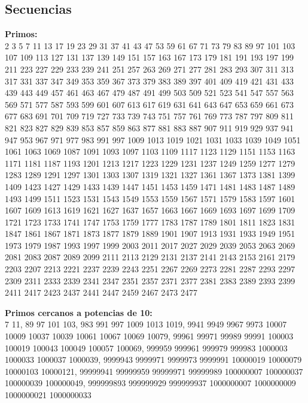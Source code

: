 \documentclass[10pt,landscape,twocolumn,letterpaper,twosided]{article}
\begin{document}
				\subsection{Secuencias}
						
					\textbf{Primos:}\\
					\vspace{3mm}
					2 3 5 7 11 13 17 19 23 29 31 37 41 43 47 53 59 61 67 71 73 79 83 89 97 101 103 107 109 113 127 131 137 139
					149 151 157 163 167 173 179 181 191 193 197 199 211 223 227 229 233 239 241 251 257 263 269 271 277 281 283
					293 307 311 313 317 331 337 347 349 353 359 367 373 379 383 389 397 401 409 419 421 431 433 439 443 449 457
					461 463 467 479 487 491 499 503 509 521 523 541 547 557 563 569 571 577 587 593 599 601 607 613 617 619 631
					641 643 647 653 659 661 673 677 683 691 701 709 719 727 733 739 743 751 757 761 769 773 787 797 809 811 821
					823 827 829 839 853 857 859 863 877 881 883 887 907 911 919 929 937 941 947 953 967 971 977 983 991 997
					1009 1013 1019 1021 1031 1033 1039 1049 1051 1061 1063 1069 1087 1091 1093 1097 1103 1109 1117 1123 1129
					1151 1153 1163 1171 1181 1187 1193 1201 1213 1217 1223 1229 1231 1237 1249 1259 1277 1279 1283 1289 1291
					1297 1301 1303 1307 1319 1321 1327 1361 1367 1373 1381 1399 1409 1423 1427 1429 1433 1439 1447 1451 1453
					1459 1471 1481 1483 1487 1489 1493 1499 1511 1523 1531 1543 1549 1553 1559 1567 1571 1579 1583 1597 1601
					1607 1609 1613 1619 1621 1627 1637 1657 1663 1667 1669 1693 1697 1699 1709 1721 1723 1733 1741 1747 1753 
					1759 1777 1783 1787 1789 1801 1811 1823 1831 1847 1861 1867 1871 1873 1877 1879 1889 1901 1907 1913 1931 
					1933 1949 1951 1973 1979 1987 1993 1997 1999 2003 2011 2017 2027 2029 2039 2053 2063 2069 2081 2083 2087 
					2089 2099 2111 2113 2129 2131 2137 2141 2143 2153 2161 2179 2203 2207 2213 2221 2237 2239 2243 2251 2267 
					2269 2273 2281 2287 2293 2297 2309 2311 2333 2339 2341 2347 2351 2357 2371 2377 2381 2383 2389 2393 2399 
					2411 2417 2423 2437 2441 2447 2459 2467 2473 2477

					\vspace{8mm}
					\textbf{Primos cercanos a potencias de 10:}\\
					\vspace{3mm}
					7 11, 89 97 101 103, 983 991 997 1009 1013 1019, 
					9941 9949 9967 9973 10007 10009 10037 10039 10061 10067 10069 10079, 
					99961 99971 99989 99991 100003 100019 100043 100049 100057 100069, 
					999959 999961 999979 999983 1000003 1000033 1000037 1000039,
					9999943 9999971 9999973 9999991 10000019 10000079 10000103 10000121,
					99999941 99999959 99999971 99999989 100000007 100000037 100000039 100000049,
					999999893 999999929 999999937 1000000007 1000000009 1000000021 1000000033
					
\end{document}
